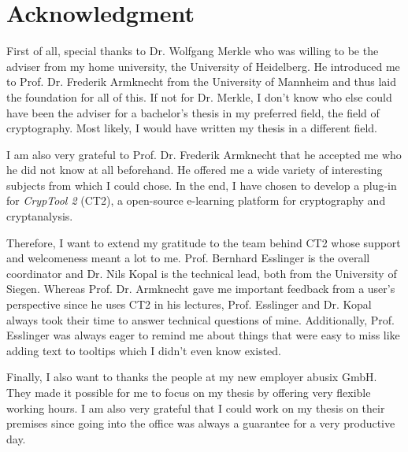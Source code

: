 
\section*{Acknowledgment}

First of all, special thanks to Dr. Wolfgang Merkle who was willing to be the adviser from my home university, the University of Heidelberg. He introduced me to Prof. Dr. Frederik Armknecht from the University of Mannheim and thus laid the foundation for all of this. If not for Dr. Merkle, I don't know who else could have been the adviser for a bachelor's thesis in my preferred field, the field of cryptography. Most likely, I would have written my thesis in a different field.

\medskip
\noindent
I am also very grateful to Prof. Dr. Frederik Armknecht that he accepted me who he did not know at all beforehand. He offered me a wide variety of interesting subjects from which I could chose. In the end, I have chosen to develop a plug-in for \textit{CrypTool 2} (CT2), a open-source e-learning platform for cryptography and cryptanalysis.

\medskip
\noindent
Therefore, I want to extend my gratitude to the team behind CT2 whose support and welcomeness meant a lot to me. Prof. Bernhard Esslinger is the overall coordinator and Dr. Nils Kopal is the technical lead, both from the University of Siegen.
Whereas Prof. Dr. Armknecht gave me important feedback from a user's perspective since he uses CT2 in his lectures, Prof. Esslinger and Dr. Kopal always took their time to answer technical questions of mine. Additionally, Prof. Esslinger was always eager to remind me about things that were easy to miss like adding text to tooltips which I didn't even know existed. 

\medskip
\noindent
Finally, I also want to thanks the people at my new employer abusix GmbH. They made it possible for me to focus on my thesis by offering very flexible working hours. I am also very grateful that I could work on my thesis on their premises since going into the office was always a guarantee for a very productive day.